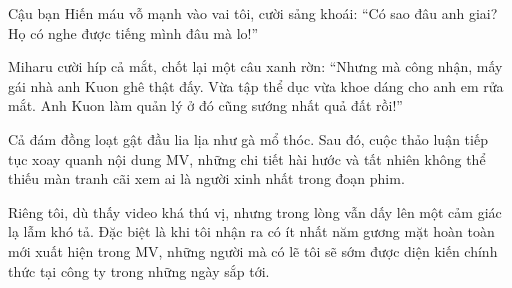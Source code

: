 \documentclass[../main.tex]{subfiles}
\begin{document}
Cậu bạn Hiến máu vỗ mạnh vào vai tôi, cười sảng khoái: ``Có sao đâu anh giai? Họ có nghe được tiếng mình đâu mà lo!''

Miharu cười híp cả mắt, chốt lại một câu xanh rờn: ``Nhưng mà công nhận, mấy gái nhà anh Kuon ghê thật đấy. Vừa tập thể dục vừa khoe dáng cho anh em rửa mắt. Anh Kuon làm quản lý ở đó cũng sướng nhất quả đất rồi!''

Cả đám đồng loạt gật đầu lia lịa như gà mổ thóc. Sau đó, cuộc thảo luận tiếp tục xoay quanh nội dung MV, những chi tiết hài hước và tất nhiên không thể thiếu màn tranh cãi xem ai là người xinh nhất trong đoạn phim.

Riêng tôi, dù thấy video khá thú vị, nhưng trong lòng vẫn dấy lên một cảm giác lạ lẫm khó tả. Đặc biệt là khi tôi nhận ra có ít nhất năm gương mặt hoàn toàn mới xuất hiện trong MV, những người mà có lẽ tôi sẽ sớm được diện kiến chính thức tại công ty trong những ngày sắp tới.
\end{document}
